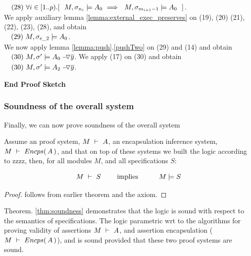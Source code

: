 \begin{description}
$\ \strut \ \ (28)\    \forall i\in[1..p).[ \ \  M, \sigma_{n_{i}} \models A_0 \ \Longrightarrow \ \ M, \sigma_{m_{i+1}-1} \models A_0 \ \ ]$.\\
We apply auxiliary lemma \ref{lemma:external_exec_preserves} on (19), (20) (21), (22), (23), (28), and obtain\\
$\ \strut \ \ (29) \   M, \sigma_{e\_2} \models A_0$.\\
We now apply lemma \ref{lemma:push}.\ref{pushTwo} on (29) and  (14) and obtain\\
$\ \strut \ \ (30) \   M, \sigma'  \models \PushAS  {y}{A_0}$.
We apply (17) on (30) and obtain\\
$\ \strut \ \ (30) \   M, \sigma'  \models \PushAS  {y}{A_2}$.
\end{description}
\noindent
\vspace{.1cm}
  {\textbf{End Proof Sketch}} 

\vspace{1cm}

  \subsubsection{Soundness of the overall system}
Finally, we can now prove soundness of the overall system

\begin{theorem}[Soundness]
\label{thm:soundness}
Assume an \SpecO proof system, $\proves{M}{A}$, 
an encapsulation inference system, $\proves{M}{\encaps{A}}$,
 and  that on top of these systems we built
 the \SpecLang logic according to zzzz,  then, for    all modules $M$, and all \SpecLang specifications  $S$:
 
 $$\proves{M}{S}\ \ \ \ \ \ \ \mbox{implies}\ \ \ \ \ \  \ \ \ \satisfies{M}{S}$$
\end{theorem}

\begin{proof}
follows from earlier theorem and the axiom.
\end{proof}
 


Theorem. \ref{thm:soundness} demonstrates 
 that the   \SpecLang logic is sound with respect to the semantics of \SpecLang specifications.
 The \SpecLang logic parametric wrt to the algorithms for proving validity of assertions
 $\proves{M}{A}$, and 
 assertion encapsulation ($\proves{M}{\encaps{A}}$), and is sound
 provided that these two proof systems are sound.


